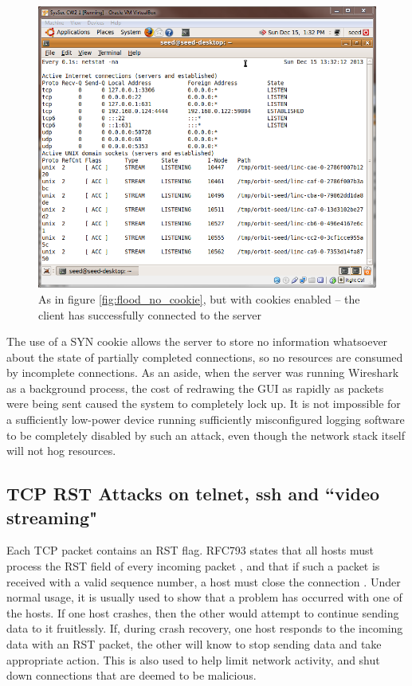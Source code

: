 \begin{figure}[h]
    \centering \includegraphics[width=.7\linewidth]{images/syn_flood_cookie.png}
    \caption{As in figure \ref{fig:flood_no_cookie}, but with cookies enabled -- the client has successfully connected to
    the server}
    \label{fig:flood_with_cookie}
\end{figure}

The use of a SYN cookie allows the server to store no information whatsoever about the state of partially completed
connections, so no resources are consumed by incomplete connections. As an aside, when the server was running Wireshark
as a background process, the cost of redrawing the GUI as rapidly as packets were being sent caused the system to
completely lock up. It is not impossible for a sufficiently low-power device running sufficiently misconfigured logging
software to be completely disabled by such an attack, even though the network stack itself will not hog resources.

\subsection{TCP RST Attacks on telnet, ssh and ``video streaming"}

Each TCP packet contains an RST flag. RFC793 states that all hosts must process the RST field of every incoming packet
\cite[p. 26]{rfc793}, and that if such a packet is received with a valid sequence number, a host must close the
connection \cite[p. 37]{rfc793}. Under normal usage, it is usually used to show that a problem has occurred with one of
the hosts. If one host crashes, then the other would attempt to continue sending data to it fruitlessly. If, during
crash recovery, one host responds to the incoming data with an RST packet, the other will know to stop sending data and
take appropriate action. This is also used to help limit network activity, and shut down connections that are deemed to
be malicious.


